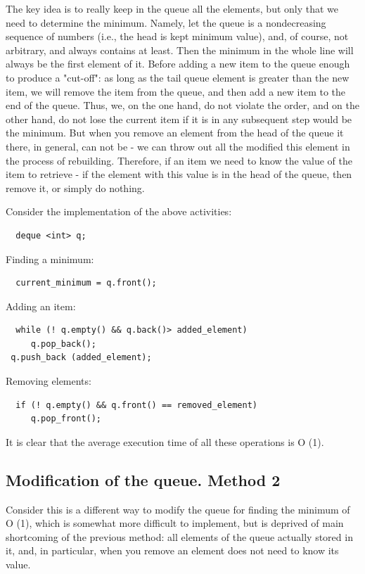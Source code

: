The key idea is to really keep in the queue all the elements, but only that we need to determine the minimum. Namely, let the queue is a nondecreasing sequence of numbers (i.e., the head is kept minimum value), and, of course, not arbitrary, and always contains at least. Then the minimum in the whole line will always be the first element of it. Before adding a new item to the queue enough to produce a "cut-off": as long as the tail queue element is greater than the new item, we will remove the item from the queue, and then add a new item to the end of the queue. Thus, we, on the one hand, do not violate the order, and on the other hand, do not lose the current item if it is in any subsequent step would be the minimum. But when you remove an element from the head of the queue it there, in general, can not be - we can throw out all the modified this element in the process of rebuilding. Therefore, if an item we need to know the value of the item to retrieve - if the element with this value is in the head of the queue, then remove it, or simply do nothing.

Consider the implementation of the above activities:

\begin{verbatim}
  deque <int> q; 
\end{verbatim}
Finding a minimum: \begin{verbatim}
  current_minimum = q.front(); 
\end{verbatim}
Adding an item: \begin{verbatim}
  while (! q.empty() && q.back()> added_element)
     q.pop_back();
 q.push_back (added_element); 
\end{verbatim}
Removing elements: \begin{verbatim}
  if (! q.empty() && q.front() == removed_element)
     q.pop_front(); 
\end{verbatim}
It is clear that the average execution time of all these operations is O (1).

\subsection{ Modification of the queue. Method 2 }
Consider this is a different way to modify the queue for finding the minimum of O (1), which is somewhat more difficult to implement, but is deprived of main shortcoming of the previous method: all elements of the queue actually stored in it, and, in particular, when you remove an element does not need to know its value.


